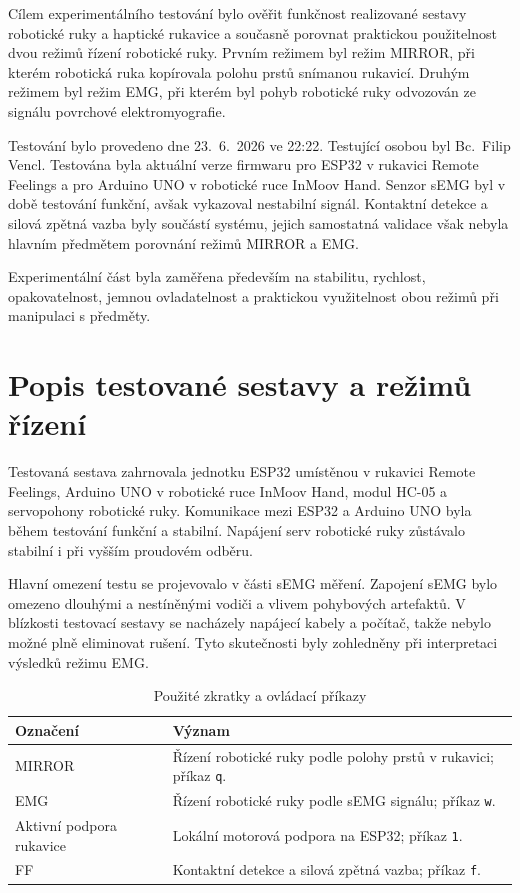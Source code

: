 \documentclass[FZS,DP]{tulthesis}
\begin{document}
Cílem experimentálního testování bylo ověřit funkčnost realizované sestavy robotické ruky a haptické rukavice a současně porovnat praktickou použitelnost dvou režimů řízení robotické ruky. Prvním režimem byl režim MIRROR, při kterém robotická ruka kopírovala polohu prstů snímanou rukavicí. Druhým režimem byl režim EMG, při kterém byl pohyb robotické ruky odvozován ze signálu povrchové elektromyografie.

Testování bylo provedeno dne 23.~6.~2026 ve 22:22. Testující osobou byl Bc.~Filip Vencl. Testována byla aktuální verze firmwaru pro ESP32 v rukavici Remote Feelings a pro Arduino UNO v robotické ruce InMoov Hand. Senzor sEMG byl v době testování funkční, avšak vykazoval nestabilní signál. Kontaktní detekce a silová zpětná vazba byly součástí systému, jejich samostatná validace však nebyla hlavním předmětem porovnání režimů MIRROR a EMG\@.

Experimentální část byla zaměřena především na stabilitu, rychlost, opakovatelnost, jemnou ovladatelnost a praktickou využitelnost obou režimů při manipulaci s předměty.

\section{Popis testované sestavy a režimů řízení}
\label{sec:popis-testovane-sestavy}

Testovaná sestava zahrnovala jednotku ESP32 umístěnou v rukavici Remote Feelings, Arduino UNO v robotické ruce InMoov Hand, modul HC-05 a servopohony robotické ruky. Komunikace mezi ESP32 a Arduino UNO byla během testování funkční a stabilní. Napájení serv robotické ruky zůstávalo stabilní i při vyšším proudovém odběru.

Hlavní omezení testu se projevovalo v části sEMG měření. Zapojení sEMG bylo omezeno dlouhými a nestíněnými vodiči a vlivem pohybových artefaktů. V blízkosti testovací sestavy se nacházely napájecí kabely a počítač, takže nebylo možné plně eliminovat rušení. Tyto skutečnosti byly zohledněny při interpretaci výsledků režimu EMG\@.

\begin{table}[H]
\centering
\caption{Použité zkratky a ovládací příkazy}
\label{tab:pouzite-zkratky-prikazy}
\begin{tabular}{|p{}|p{}|}
\hline
\textbf{Označení} & \textbf{Význam} \\
\hline
MIRROR & Řízení robotické ruky podle polohy prstů v rukavici; příkaz \texttt{q}. \\
\hline
EMG & Řízení robotické ruky podle sEMG signálu; příkaz \texttt{w}. \\
\hline
Aktivní podpora rukavice & Lokální motorová podpora na ESP32; příkaz \texttt{1}. \\
\hline
FF & Kontaktní detekce a silová zpětná vazba; příkaz \texttt{f}. \\
\hline
\end{tabular}
\end{table}
\end{document}
